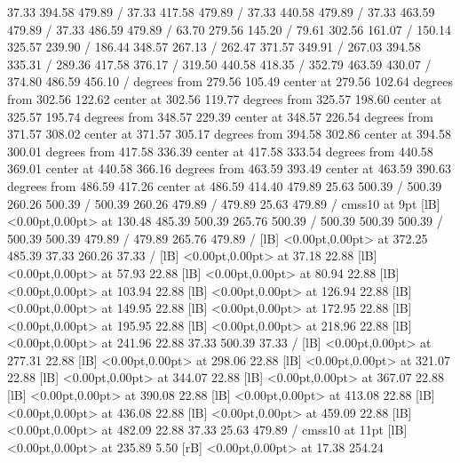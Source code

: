 {\setsolid
{} 37.33 394.58 479.89 /
\setsolid
{} 37.33 417.58 479.89 /
\setsolid
{} 37.33 440.58 479.89 /
\setsolid
{} 37.33 463.59 479.89 /
\setsolid
{} 37.33 486.59 479.89 /
\setsolid
{} 63.70 279.56 145.20 /
\setsolid
{} 79.61 302.56 161.07 /
\setsolid
{} 150.14 325.57 239.90 /
\setsolid
{} 186.44 348.57 267.13 /
\setsolid
{} 262.47 371.57 349.91 /
\setsolid
{} 267.03 394.58 335.31 /
\setsolid
{} 289.36 417.58 376.17 /
\setsolid
{} 319.50 440.58 418.35 /
\setsolid
{} 352.79 463.59 430.07 /
\setsolid
{} 374.80 486.59 456.10 /
 degrees from 279.56 105.49 center at 279.56 102.64
 degrees from 302.56 122.62 center at 302.56 119.77
 degrees from 325.57 198.60 center at 325.57 195.74
 degrees from 348.57 229.39 center at 348.57 226.54
 degrees from 371.57 308.02 center at 371.57 305.17
 degrees from 394.58 302.86 center at 394.58 300.01
 degrees from 417.58 336.39 center at 417.58 333.54
 degrees from 440.58 369.01 center at 440.58 366.16
 degrees from 463.59 393.49 center at 463.59 390.63
 degrees from 486.59 417.26 center at 486.59 414.40
\setsolid
{} 479.89 25.63 500.39 /
 500.39 260.26 500.39 /
 500.39 260.26 479.89 /
 479.89 25.63 479.89 /
\font\picfont cmss10 at 9pt\picfont
{}  [lB] <0.00pt,0.00pt> at 130.48 485.39
\setsolid
{} 500.39 265.76 500.39 /
 500.39 500.39 500.39 /
 500.39 500.39 479.89 /
 479.89 265.76 479.89 /
  [lB] <0.00pt,0.00pt> at 372.25 485.39
\setsolid
{} 37.33 260.26 37.33 /
  [lB] <0.00pt,0.00pt> at 37.18 22.88
  [lB] <0.00pt,0.00pt> at 57.93 22.88
  [lB] <0.00pt,0.00pt> at 80.94 22.88
  [lB] <0.00pt,0.00pt> at 103.94 22.88
  [lB] <0.00pt,0.00pt> at 126.94 22.88
  [lB] <0.00pt,0.00pt> at 149.95 22.88
  [lB] <0.00pt,0.00pt> at 172.95 22.88
  [lB] <0.00pt,0.00pt> at 195.95 22.88
  [lB] <0.00pt,0.00pt> at 218.96 22.88
  [lB] <0.00pt,0.00pt> at 241.96 22.88
\setsolid
{} 37.33 500.39 37.33 /
  [lB] <0.00pt,0.00pt> at 277.31 22.88
  [lB] <0.00pt,0.00pt> at 298.06 22.88
  [lB] <0.00pt,0.00pt> at 321.07 22.88
  [lB] <0.00pt,0.00pt> at 344.07 22.88
  [lB] <0.00pt,0.00pt> at 367.07 22.88
  [lB] <0.00pt,0.00pt> at 390.08 22.88
  [lB] <0.00pt,0.00pt> at 413.08 22.88
  [lB] <0.00pt,0.00pt> at 436.08 22.88
  [lB] <0.00pt,0.00pt> at 459.09 22.88
  [lB] <0.00pt,0.00pt> at 482.09 22.88
\setsolid
{} 37.33 25.63 479.89 /
\font\picfont cmss10 at 11pt\picfont
{}  [lB] <0.00pt,0.00pt> at 235.89 5.50
 [rB] <0.00pt,0.00pt> at 17.38 254.24
\endpicture
}
